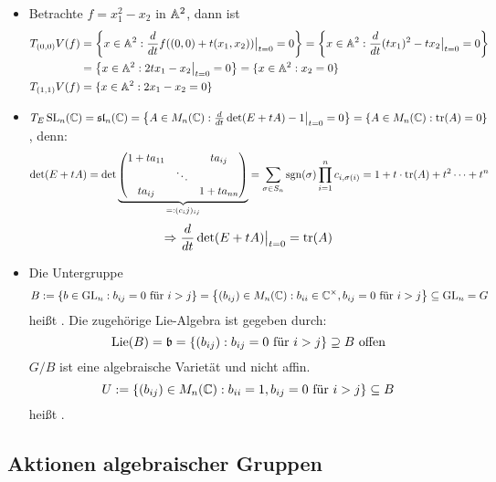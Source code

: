 	\begin{itemize}
		\item Betrachte $f = x_1^2-x_2$ in $\aff^2$, dann ist
		\begin{equation}
		\begin{aligned}
			T_{(0,0)}V(f) &= \penbrace*{x \in \aff^2 : \frac{d}{dt} f( (0,0) + t(x_1,x_2)) \big|_{t=0} = 0 } = \penbrace*{x \in \aff^2 : \frac{d}{dt} (tx_1)^2 - tx_2 \big|_{t=0} = 0} \\
			&= \penbrace*{x \in \aff^2 : 2tx_1 - x_2 \big|_{t=0} = 0} = \{ x \in \aff^2 : x_2 = 0 \} \\
			T_{(1,1)}V(f) &= \{ x \in \aff^2 : 2x_1 - x_2 = 0 \}
		\end{aligned}
		\end{equation}
		\item $T_{E}\SL_n(\CC) = \slie_n(\CC) = \penbrace*{A \in M_n(\CC) : \frac{d}{dt} \det(E + tA) - 1 \big|_{t=0} = 0} = \{A \in M_n(\CC) : \tr(A) = 0 \}$, denn:
		\[ \det(E+tA) = \det \underbrace{\begin{pmatrix}
		1+ta_{11} &  & ta_{ij} \\ 
		& \ddots &  \\ 
		ta_{ij} &  & 1+ta_{nn}
		\end{pmatrix}}_{=:(c_ij)_{ij}} = \sum\limits_{\sigma \in S_n} \sgn(\sigma) \prod\limits_{i=1}^n c_{i,\sigma(i)} = 1 + t \cdot \tr(A) + t^2\dots + t^n \]
		\[ \Rightarrow \frac{d}{dt} \det(E+tA) \big|_{t=0} = \tr(A) \]
		\item Die Untergruppe
		\[ B := \penbrace*{ b \in \GL_n : b_{ij} = 0 \text{ für } i>j} = \penbrace*{(b_{ij}) \in M_n(\CC) : b_{ii} \in \CC^\times, b_{ij} = 0 \text{ für } i>j} \subseteq \GL_n = G\]
		heißt . Die zugehörige Lie-Algebra ist gegeben durch:
		\[ \Lie(B) = \mathfrak{b} = \penbrace{ (b_{ij}) : b_{ij} = 0 \text{ für } i > j} \supseteq B \text{ offen} \]
		$G/B$ ist eine algebraische Varietät und nicht affin.
		\[U := \penbrace*{(b_{ij}) \in M_n(\CC) : b_{ii} = 1, b_{ij} = 0 \text{ für } i>j} \subseteq B\]
		heißt .
	\end{itemize}

\subsection{Aktionen algebraischer Gruppen}
\label{sub:abschnitt_0.2}

